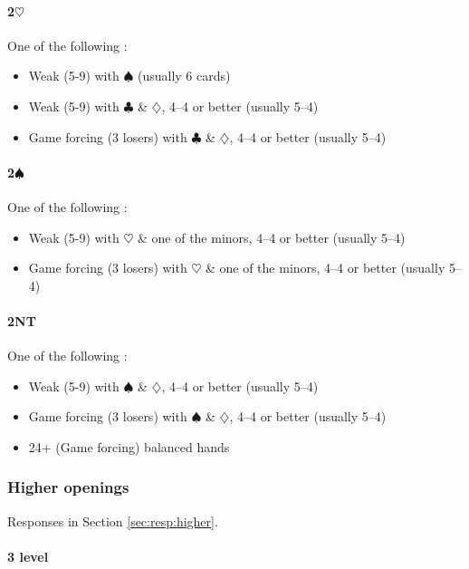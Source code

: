 \documentclass[a4paper,14pt]{extarticle}
\begin{document}
\paragraph{2$\heartsuit$}
One of the following :
\begin{itemize}
\item Weak (5-9) with $\spadesuit$ (usually 6 cards)
\item Weak (5-9) with $\clubsuit$ \& $\diamondsuit$, 4--4 or better (usually 5--4)
\item Game forcing (3 losers) with $\clubsuit$ \& $\diamondsuit$, 4--4 or better (usually 5--4)
\end{itemize}

\paragraph{2$\spadesuit$}
One of the following :
\begin{itemize}
\item Weak (5-9) with $\heartsuit$ \& one of the minors, 4--4 or better (usually 5--4)
\item Game forcing (3 losers) with $\heartsuit$ \& one of the minors, 4--4 or better (usually 5--4)
\end{itemize}

\paragraph{2NT}
One of the following :
\begin{itemize}
\item Weak (5-9) with $\spadesuit$ \& $\diamondsuit$, 4--4 or better (usually 5--4)
\item Game forcing (3 losers) with $\spadesuit$ \& $\diamondsuit$, 4--4 or better (usually 5--4)
\item 24+ (Game forcing) balanced hands
\end{itemize}

\subsubsection{Higher openings}
\label{sec:open:higher}

Responses in Section \ref{sec:resp:higher}.

\paragraph{3 level}
\end{document}
